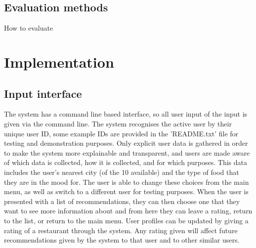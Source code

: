 \documentclass[conference]{IEEEtran}
\begin{document}
\subsection{Evaluation methods}
How to evaluate


\section{Implementation}

\subsection{Input interface}
The system has a command line based interface, so all user input of the input is given via the command line. 
The system recognises the active user by their unique user ID, some example IDs are provided in the 'README.txt' 
file for testing and demonstration purposes. 
Only explicit user data is gathered in order to make the system more explainable and transparent, 
and users are made aware of which data is collected, how it is collected, and for which purposes. 
This data includes the user's nearest city (of the 10 available) and the type of food that 
they are in the mood for. 
The user is able to change these choices from the main menu, as well as switch to a different user 
for testing purposes. 
When the user is presented with a list of recommendations, they can then choose one that they want 
to see more information about and from here they can leave a rating, return to the list, or return to 
the main menu. 
User profiles can be updated by giving a rating of a restaurant through the system. 
Any rating given will affect future recommendations given by the system to that user 
and to other similar users. 
\end{document}
